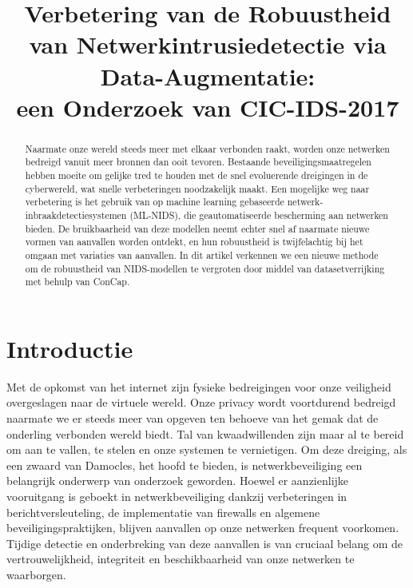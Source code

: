 \documentclass[conference]{IEEEtran}
\begin{document}
	
	\title{Verbetering van de Robuustheid van Netwerkintrusiedetectie via Data-Augmentatie:\\ een Onderzoek van CIC-IDS-2017}
		
	\author{
	}
	
	\maketitle
	\pagestyle{plain}
	
	\begin{abstract}
		Naarmate onze wereld steeds meer met elkaar verbonden raakt, worden onze netwerken bedreigd vanuit meer bronnen dan ooit tevoren. Bestaande beveiligingsmaatregelen hebben moeite om gelijke tred te houden met de snel evoluerende dreigingen in de cyberwereld, wat snelle verbeteringen noodzakelijk maakt. Een mogelijke weg naar verbetering is het gebruik van op machine learning gebaseerde netwerk-inbraakdetectiesystemen (ML-NIDS), die geautomatiseerde bescherming aan netwerken bieden. De bruikbaarheid van deze modellen neemt echter snel af naarmate nieuwe vormen van aanvallen worden ontdekt, en hun robuustheid is twijfelachtig bij het omgaan met variaties van aanvallen. In dit artikel verkennen we een nieuwe methode om de robuustheid van NIDS-modellen te vergroten door middel van datasetverrijking met behulp van ConCap.
	\end{abstract}
	
	\section{Introductie}
	Met de opkomst van het internet zijn fysieke bedreigingen voor onze veiligheid overgeslagen naar de virtuele wereld. Onze privacy wordt voortdurend bedreigd naarmate we er steeds meer van opgeven ten behoeve van het gemak dat de onderling verbonden wereld biedt. Tal van kwaadwillenden zijn maar al te bereid om aan te vallen, te stelen en onze systemen te vernietigen. Om deze dreiging, als een zwaard van Damocles, het hoofd te bieden, is netwerkbeveiliging een belangrijk onderwerp van onderzoek geworden. Hoewel er aanzienlijke vooruitgang is geboekt in netwerkbeveiliging dankzij verbeteringen in berichtversleuteling, de implementatie van firewalls en algemene beveiligingspraktijken, blijven aanvallen op onze netwerken frequent voorkomen. Tijdige detectie en onderbreking van deze aanvallen is van cruciaal belang om de vertrouwelijkheid, integriteit en beschikbaarheid van onze netwerken te waarborgen.
	
\end{document}
